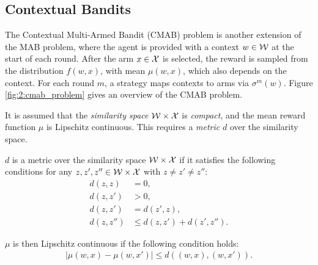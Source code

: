 \subsection{Contextual Bandits} %
\label{sec:2-1-3-contextual-mab}

    The Contextual Multi-Armed Bandit (CMAB) problem \cite{cz,cmab_alt,cz_long} is another extension of the MAB problem, where the agent is provided with a context $w\in\mathcal{W}$ at the start of each round. After the arm $x\in\mathcal{X}$ is selected, the reward is sampled from the distribution $f(w,x)$, with mean $\mu(w,x)$, which also depends on the context. For each round $m$, a strategy maps contexts to arms via $\sigma^m(w)$. Figure \ref{fig:2:cmab_problem} gives an overview of the CMAB problem.

    It is assumed that the \textit{similarity space} $\mathcal{W}\times\mathcal{X}$ is \textit{compact}, and the mean reward function $\mu$ is Lipschitz continuous. This requires a \textit{metric} $d$ over the similarity space.
    \begin{defn}
        \label{def:2:metric}
        $d$ is a \textnormal{metric} over the similarity space $\mathcal{W}\times\mathcal{X}$ if it satisfies the following conditions for any $z,z',z''\in\mathcal{W}\times\mathcal{X}$ with $z\neq z'\neq z''$:
        \begin{align}
            d(z,z) &= 0, \label{eq:2:metric_def_1} \\
            d(z,z') &> 0, \label{eq:2:metric_def_2} \\
            d(z,z') &= d(z',z), \label{eq:2:metric_def_3} \\
            d(z,z'') &\leq d(z,z') + d(z',z''). \label{eq:2:metric_def_4} 
        \end{align}
    \end{defn}

    $\mu$ is then Lipschitz continuous if the following condition holds:
    \begin{align}
        |\mu(w,x) - \mu(w,x')| \leq d((w,x),(w,x')). \label{eq:2:zooming_lipschitz_condition}
    \end{align}

